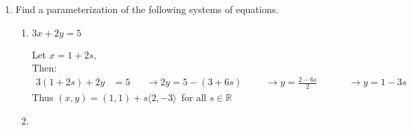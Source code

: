\documentclass{letter}
\newcommand{\Ve}[1]{\langle #1 \rangle}
\newcommand\Que[1]{%
   \leavevmode\noindent
   #1
}
\newcommand\Ans[2][]{%
   \leavevmode\noindent
   {
       \begin{mdframed}[backgroundcolor=blue!10]
       #2
       \end{mdframed}
   }
}
\begin{document}
\begin{enumerate}
\begin{enumerate}[label=(\alph*)]
{    }
    \item \Que{Adding $c$ to each term in a row.}
    \Ans{
    Adding a constant to all terms in a row would result in a different value for the equation, for example
    \begin{align*}
    3x&=15\\
    x&=5
    \shortintertext{is not equivalent to}
    5x&=17\\
    x&\approx 3.4
    \end{align*}
    Therefore this operation is \underline{forbidden}.
    }
    \item \Que{Multiplying every term in a row by $c$, then adding the corresponding terms to another row.}
    \Ans{
    If we were to conceptualize the equations of a system of linear of equations as being co-planar, any linear combination of equations in the system would form a new equation that is co-planar with the existing equations, and thus is readily acceptable as a new equation in the system.  Therefore this operation is \underline{allowed}.
    }
    \item \Que{Suppose that, after applying a sequence of allowable operations to $M$, you end up with a row consisting of all zeroes except the last entry, which is non-zero.  What does this say about the original system of equations?}
    \Ans{If by "last entry" you mean the augmented column, then you have a system of equations with no viable solutions, as there is no way that a combination of variables all scaled by zero can equal a non-zero value.
    }
    \end{enumerate}
    \newpage
    \item Find a parameterization of the following systems of equations.
    \begin{enumerate}[label=(\alph*)]
    \item \Que{
        \begin{minipage}[t]{0.25\textwidth}
        \begin{flushright}
        $3x+2y=5$
        \end{flushright}
        \end{minipage}
        }
    \Ans{
    Let $x=1+2s$, \\ 
    Then:
    \begin{align*}
      3(1+2s) + 2y &= 5 &&\rightarrow 2y = 5-(3+6s) &&&\rightarrow
      y =\frac{2-6s}{2}&&&&\rightarrow y=1-3s
    \end{align*}
    Thus $(x,y) = (1,1) + s\Ve{2,-3}$\ for all $s \in \mathbb{R}$
    }
    \item \Que{
}
\end{enumerate}
\end{enumerate}
\end{document}
